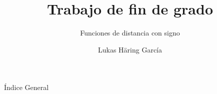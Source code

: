 \documentclass[spanish]{beamer}
\author{Lukas Häring García}
\title{Trabajo de fin de grado}
\subtitle{Funciones de distancia con signo}
\begin{document}
    \begin{frame}{Índice General}
        \tableofcontents
    \end{frame}
    
    
    
    
    
    
    
    
    
    
    
    
    
    
    
    
    
\end{document}
